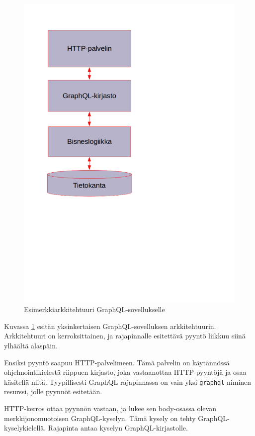 \begin{figure}
\centering
\includegraphics{illustration/GraphQL-arkkitehtuuri.png}
\caption{\label{graphqlarkkitehtuuri} Esimerkkiarkkitehtuuri
GraphQL-sovellukselle}
\end{figure}

Kuvassa \ref{graphqlarkkitehtuuri} esitän yksinkertaisen
GraphQL-sovelluksen arkkitehtuurin. Arkkitehtuuri on kerroksittainen, ja
rajapinnalle esitettävä pyyntö liikkuu siinä ylhäältä alaspäin.

Ensiksi pyyntö saapuu HTTP-palvelimeen. Tämä palvelin on käytännössä
ohjelmointikielestä riippuen kirjasto, joka vastaanottaa HTTP-pyyntöjä
ja osaa käsitellä niitä. Tyypillisesti GraphQL-rajapinnassa on vain yksi
\texttt{graphql}-niminen resurssi, jolle pyynnöt esitetään.

HTTP-kerros ottaa pyynnön vastaan, ja lukee sen body-osassa olevan
merkkijonomuotoisen GraphQL-kyselyn. Tämä kysely on tehty
GraphQL-kyselykielellä. Rajapinta antaa kyselyn GraphQL-kirjastolle.

